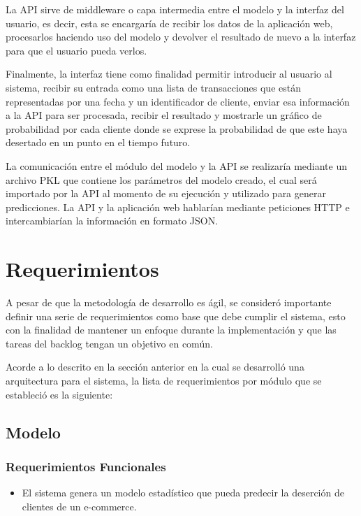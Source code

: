 	La API sirve de middleware o capa intermedia entre el modelo y la interfaz del usuario, es decir, esta se encargaría de recibir los datos de la aplicación web, procesarlos haciendo uso del modelo y devolver el resultado de nuevo a la interfaz para que el usuario pueda verlos.

	Finalmente, la interfaz tiene como finalidad permitir introducir al usuario al sistema, recibir su entrada como una lista de transacciones que están representadas por una fecha y un identificador de cliente, enviar esa información a la API para ser procesada, recibir el resultado y mostrarle un gráfico de probabilidad por cada cliente donde se exprese la probabilidad de que este haya desertado en un punto en el tiempo futuro.
	
	La comunicación entre el módulo del modelo y la API se realizaría mediante un archivo PKL que contiene los parámetros del modelo creado, el cual será importado por la API al momento de su ejecución y utilizado para generar predicciones. La API y la aplicación web hablarían mediante peticiones HTTP e intercambiarían la información en formato JSON.

\section{Requerimientos}

A pesar de que la metodología de desarrollo es ágil, se consideró importante definir una serie de requerimientos como base que debe cumplir el sistema, esto con la finalidad de mantener un enfoque durante la implementación y que las tareas del backlog tengan un objetivo en común.

	Acorde a lo descrito en la sección anterior en la cual se desarrolló una arquitectura para el sistema, la lista de requerimientos por módulo que se estableció es la siguiente: 

\subsection{Modelo}

\subsubsection{Requerimientos Funcionales}

\begin{itemize}
	\item El sistema genera un modelo estadístico que pueda predecir la deserción de clientes de un e-commerce.
\end{itemize}

